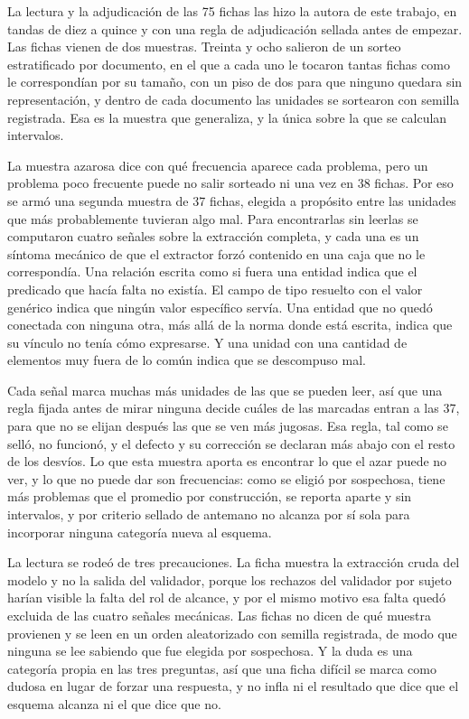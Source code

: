 \documentclass[12pt,a4paper]{report}
\begin{document}
La lectura y la adjudicación de las 75 fichas las hizo la autora de este trabajo, en tandas de diez a quince y con una regla de adjudicación sellada antes de empezar. Las fichas vienen de dos muestras. Treinta y ocho salieron de un sorteo estratificado por documento, en el que a cada uno le tocaron tantas fichas como le correspondían por su tamaño, con un piso de dos para que ninguno quedara sin representación, y dentro de cada documento las unidades se sortearon con semilla registrada. Esa es la muestra que generaliza, y la única sobre la que se calculan intervalos.

La muestra azarosa dice con qué frecuencia aparece cada problema, pero un problema poco frecuente puede no salir sorteado ni una vez en 38 fichas. Por eso se armó una segunda muestra de 37 fichas, elegida a propósito entre las unidades que más probablemente tuvieran algo mal. Para encontrarlas sin leerlas se computaron cuatro señales sobre la extracción completa, y cada una es un síntoma mecánico de que el extractor forzó contenido en una caja que no le correspondía. Una relación escrita como si fuera una entidad indica que el predicado que hacía falta no existía. El campo de tipo resuelto con el valor genérico indica que ningún valor específico servía. Una entidad que no quedó conectada con ninguna otra, más allá de la norma donde está escrita, indica que su vínculo no tenía cómo expresarse. Y una unidad con una cantidad de elementos muy fuera de lo común indica que se descompuso mal.

Cada señal marca muchas más unidades de las que se pueden leer, así que una regla fijada antes de mirar ninguna decide cuáles de las marcadas entran a las 37, para que no se elijan después las que se ven más jugosas. Esa regla, tal como se selló, no funcionó, y el defecto y su corrección se declaran más abajo con el resto de los desvíos. Lo que esta muestra aporta es encontrar lo que el azar puede no ver, y lo que no puede dar son frecuencias: como se eligió por sospechosa, tiene más problemas que el promedio por construcción, se reporta aparte y sin intervalos, y por criterio sellado de antemano no alcanza por sí sola para incorporar ninguna categoría nueva al esquema.

La lectura se rodeó de tres precauciones. La ficha muestra la extracción cruda del modelo y no la salida del validador, porque los rechazos del validador por sujeto harían visible la falta del rol de alcance, y por el mismo motivo esa falta quedó excluida de las cuatro señales mecánicas. Las fichas no dicen de qué muestra provienen y se leen en un orden aleatorizado con semilla registrada, de modo que ninguna se lee sabiendo que fue elegida por sospechosa. Y la duda es una categoría propia en las tres preguntas, así que una ficha difícil se marca como dudosa en lugar de forzar una respuesta, y no infla ni el resultado que dice que el esquema alcanza ni el que dice que no.
\end{document}
